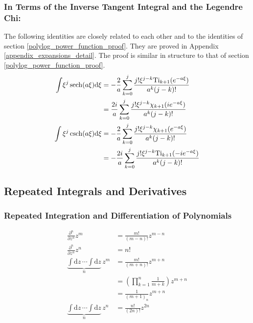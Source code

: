 \subsubsection{In Terms of the Inverse Tangent Integral and the Legendre Chi:}
The following identities are closely related to each other and to the identities of section \ref{polylog_power_function_proof}.  They are proved in Appendix \ref{appendix_expansions_detail}.  The proof is similar in structure to that of section \ref{polylog_power_function_proof}.
\begin{align}
	\int \! \xi^j \operatorname{sech}(a\xi) \mathrm{d}\xi
	&= -\frac{2}{a} \sum_{k=0}^j \frac{j! \xi^{j-k}
		\mathrm{Ti}_{k+1}(e^{-a\xi})}{a^k (j-k)!} \\
	&= \frac{2i}{a} \sum_{k=0}^j \frac{j! \xi^{j-k}
		\chi_{k+1}(i e^{-a\xi})}{a^k (j-k)!} \\
	\int \xi^j \operatorname{csch}(a \xi) \mathrm{d} \xi
	&= -\frac{2}{a}\sum_{k=0}^{j}
	\frac{j! \xi^{j-k} \chi_{k+1}(e^{-a\xi})}{a^k (j-k)!} \\
	&= -\frac{2i}{a}\sum_{k=0}^{j}
	\frac{j! \xi^{j-k} \mathrm{Ti}_{k+1}(-i e^{-a\xi})}{a^k (j-k)!}
\end{align}

\subsection{Repeated Integrals and Derivatives}

\subsubsection{Repeated Integration and Differentiation of Polynomials}
\begin{align}
	\frac{\partial^n}{\partial z^n} z^m &= \frac{m!}{(m-n)!} z^{m-n} \\
	\frac{\partial^n}{\partial z^n} z^n &= n! \\
    \underbrace{\int \! \mathrm{d}z \, \cdots \int \! \mathrm{d}z}_{n} \, z^m &=
    \frac{m!}{(m+n)!}z^{m+n} \\
    &= \left(\prod_{k=1}^{n}\frac{1}{m+k}\right)z^{m+n} \\
    &= \frac{1}{(m+1)_n}z^{m+n} \\
    \underbrace{\int \! \mathrm{d}z \, \cdots \int \! \mathrm{d}z}_{n} \, z^n &=
    \frac{n!}{(2n)!}z^{2n}
\end{align}

